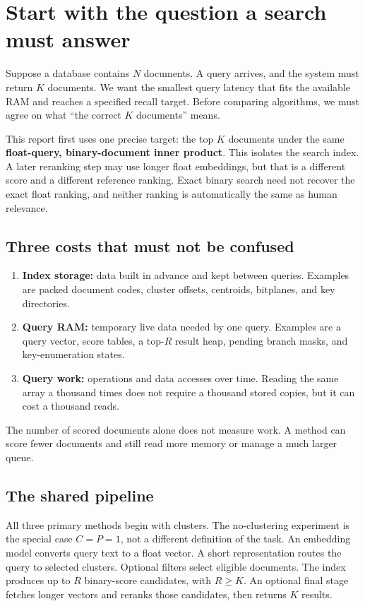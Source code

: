 \section{Start with the question a search must answer}
Suppose a database contains $N$ documents. A query arrives, and the system must return $K$
documents. We want the smallest query latency that fits the available RAM and reaches a
specified recall target. Before comparing algorithms, we must agree on what ``the correct
$K$ documents'' means.

This report first uses one precise target: the top $K$ documents under the same
\textbf{float-query, binary-document inner product}. This isolates the search index. A later
reranking step may use longer float embeddings, but that is a different score and a different
reference ranking. Exact binary search need not recover the exact float ranking, and neither
ranking is automatically the same as human relevance.

\subsection{Three costs that must not be confused}
\begin{enumerate}
\item \textbf{Index storage:} data built in advance and kept between queries. Examples are
packed document codes, cluster offsets, centroids, bitplanes, and key directories.
\item \textbf{Query RAM:} temporary live data needed by one query. Examples are a query vector,
score tables, a top-$R$ result heap, pending branch masks, and key-enumeration states.
\item \textbf{Query work:} operations and data accesses over time. Reading the same array a
thousand times does not require a thousand stored copies, but it can cost a thousand reads.
\end{enumerate}
The number of scored documents alone does not measure work. A method can score fewer documents
and still read more memory or manage a much larger queue.

\subsection{The shared pipeline}
All three primary methods begin with clusters. The no-clustering experiment is the special
case $C=P=1$, not a different definition of the task.
An embedding model converts query text to a float vector. A short representation routes the
query to selected clusters. Optional filters select eligible documents. The index produces
up to $R$ binary-score candidates, with $R\geq K$. An optional final stage fetches longer
vectors and reranks those candidates, then returns $K$ results.

